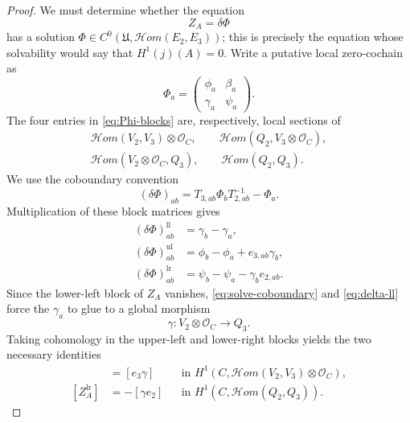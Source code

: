 \documentclass[11pt,a4paper,dvipsnames]{amsart}
\numberwithin{equation}{section}
\theoremstyle{plain}
\theoremstyle{definition}
\newcommand{\cO}{\mathcal O}
\newcommand{\cHom}{\mathcal{H}om}
\begin{document}
\begin{proof}
We must determine whether the equation
\begin{equation}\label{eq:solve-coboundary}
 Z_A=\delta\Phi
\end{equation}
has a solution
$\Phi\in C^0(\mathfrak U,\cHom(E_2,E_3))$; this is precisely the equation
whose solvability would say that $H^1(j)(A)=0$.  Write a putative local
zero-cochain as
\begin{equation}\label{eq:Phi-blocks}
 \Phi_a=
 \begin{pmatrix}
  \phi_a&\beta_a\\
  \gamma_a&\psi_a
 \end{pmatrix}.
\end{equation}
The four entries in \eqref{eq:Phi-blocks} are, respectively, local sections
of
$$
\begin{gathered}
 \cHom(V_2,V_3)\otimes\cO_C,\qquad
 \cHom(Q_2,V_3\otimes\cO_C),\\
 \cHom(V_2\otimes\cO_C,Q_3),\qquad
 \cHom(Q_2,Q_3).
\end{gathered}
$$
We use the coboundary convention
$$
 (\delta\Phi)_{ab}
 =T_{3,ab}\Phi_bT_{2,ab}^{-1}-\Phi_a.
$$
Multiplication of these block matrices gives
\begin{align}
 (\delta\Phi)_{ab}^{\mathrm{ll}}
 &=\gamma_b-\gamma_a,\label{eq:delta-ll}\\
 (\delta\Phi)_{ab}^{\mathrm{ul}}
 &=\phi_b-\phi_a+e_{3,ab}\gamma_b,\label{eq:delta-ul}\\
 (\delta\Phi)_{ab}^{\mathrm{lr}}
 &=\psi_b-\psi_a-\gamma_be_{2,ab}.\label{eq:delta-lr}
\end{align}
Since the lower-left block of $Z_A$ vanishes,
\eqref{eq:solve-coboundary} and \eqref{eq:delta-ll} force the
$\gamma_a$ to glue to a global morphism
$$
 \gamma:V_2\otimes\cO_C\longrightarrow Q_3.
$$
Taking cohomology in the upper-left and lower-right blocks yields the two
necessary identities
\begin{align}
 [Z_A^{\mathrm{ul}}]
 &=[e_3\gamma]
 &&\text{in }H^1\!\left(
 C,\cHom(V_2,V_3)\otimes\cO_C\right),
 \label{eq:block-identity-ul}\\
 [Z_A^{\mathrm{lr}}]
 &=-[\gamma e_2]
 &&\text{in }H^1\!\left(C,\cHom(Q_2,Q_3)\right).
 \label{eq:block-identity-lr}
\end{align}


\end{proof}
\end{document}
